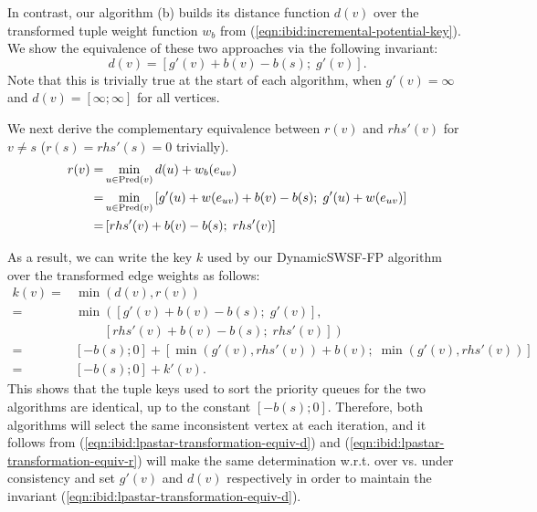 In contrast,
our algorithm (b) builds its distance function $d(v)$
over the transformed tuple weight function $w_b$
from (\ref{eqn:ibid:incremental-potential-key}).
We show the equivalence of these two approaches via the following
invariant:
\begin{equation}
   d(v) = \left[ g'(v) + b(v) - b(s) ;\; g'(v) \right].
   \label{eqn:ibid:lpastar-transformation-equiv-d}
\end{equation}
Note that this is trivially true at the start of each algorithm,
when $g'(v) = \infty$ and $d(v) = \left[ \infty ; \infty \right]$
for all vertices.

We next derive the complementary equivalence between $r(v)$ and
$rhs'(v)$ for $v \neq s$ ($r(s) = rhs'(s) = 0$ trivially).
\begin{subequations}%
   \begin{align}
      r(v) = & \min_{u \in \mbox{\scriptsize Pred}(v)} d(u) + w_b(e_{uv}) \\
      = & \min_{u \in \mbox{\scriptsize Pred}(v)}
         \left[ g'(u) + w(e_{uv}) + b(v) - b(s) ;\; g'(u) + w(e_{uv}) \right] \\
      = & \left[ rhs'(v) + b(v) - b(s) ;\; rhs'(v) \right]
         \label{eqn:ibid:lpastar-transformation-equiv-r}
   \end{align}%
\end{subequations}%

As a result,
we can write the key $k$ used by our DynamicSWSF-FP algorithm
over the transformed edge weights as follows:
\begin{subequations}
   \begin{align}
      k(v) = & \min\!\left( d(v), r(v) \right) \\
      = & \min\!\left( \left[ g'(v) + b(v) - b(s) ;\; g'(v) \right], \right. \\
        & \quad\quad\; \left. \left[ rhs'(v) + b(v) - b(s) ;\; rhs'(v) \right] \right) \\
      = & \left[ -b(s); 0 \right]
         + \left[ \min\!\left( g'(v), rhs'(v) \right) + b(v);\;
         \min\!\left( g'(v), rhs'(v) \right) \right] \\
      = & \left[ -b(s); 0 \right] + k'(v).
   \end{align}%
\end{subequations}%
This shows that the tuple keys used to sort the priority queues
for the two algorithms are identical,
up to the constant $\left[ -b(s); 0 \right]$.
Therefore,
both algorithms will select the same inconsistent vertex at each
iteration,
and it follows from (\ref{eqn:ibid:lpastar-transformation-equiv-d})
and (\ref{eqn:ibid:lpastar-transformation-equiv-r})
will make the same determination w.r.t. over vs. under consistency
and set $g'(v)$ and $d(v)$ respectively in order to maintain
the invariant (\ref{eqn:ibid:lpastar-transformation-equiv-d}).

